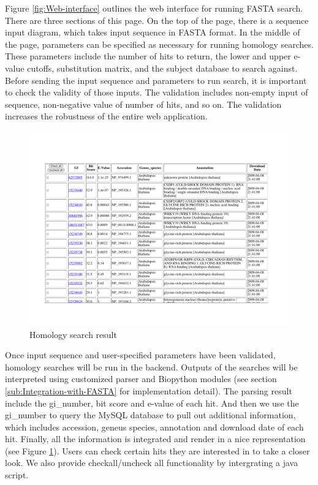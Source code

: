 \documentclass[11pt,letterpaper,twoside,english]{article}
\begin{document}
Figure \ref{fig:Web-interface} outlines the web interface for running
FASTA search. There are three sections of this page. On the top of
the page, there is a sequence input diagram, which takes input sequence
in FASTA format. In the middle of the page, parameters can be specified
as necessary for running homology searches. These parameters include
the number of hits to return, the lower and upper e-value cutoffs,
substitution matrix, and the subject database to search against. Before
sending the input sequence and parameters to run search, it is important
to check the validity of those inputs. The validation includes non-empty
input of sequence, non-negative value of number of hits, and so on.
The validation increases the robustness of the entire web application.

\begin{figure}[tbp]
    \begin{center}
        \includegraphics[width=1\linewidth]{figures/Result_selection}
    \end{center}
    \caption{\label{fig:Homology-search-result}Homology search result}
\end{figure}

Once input sequence and user-specified parameters have been validated,
homology searches will be run in the backend. Outputs of the searches
will be interpreted using customized parser and Biopython modules
(see section \ref{sub:Integration-with-FASTA} for implementation
detail). The parsing result include the gi\_number, bit score and
e-value of each hit. And then we use the gi\_number to query the MySQL
database to pull out additional information, which includes accession,
geneus species, annotation and download date of each hit. Finally,
all the information is integrated and render in a nice representation
(see Figure \ref{fig:Homology-search-result}). Users can check certain
hits they are interested in to take a closer look. We also provide
checkall/uncheck all functionality by intergrating a java script.
\end{document}
